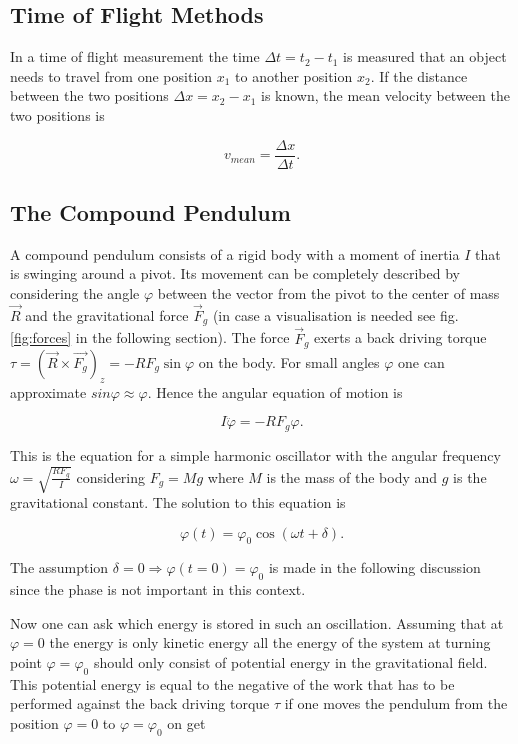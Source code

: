 \subsection{Time of Flight Methods}

In a time of flight measurement the time $\Delta t=t_2-t_1$ is measured that an object needs to travel from one position $x_1$ to another position $x_2$. If the distance between the two positions $\Delta x=x_2-x_1$ is known, the mean velocity between the two positions is

\begin{equation}
v_{mean}=\frac{\Delta x}{\Delta t}.
\end{equation}

\subsection{The Compound Pendulum}

A compound pendulum consists of a rigid body with a moment of inertia $I$ that is swinging around a pivot. Its movement can be completely described by considering the angle $\varphi$ between the vector from the pivot to the center of mass $\vec{R}$ and the gravitational force $\vec{F}_g$ (in case a visualisation is needed see fig. \ref{fig:forces} in the following section). The force $\vec{F}_g$ exerts a back driving torque $\tau = (\vec{R} \times \vec{F_g})_z = -R F_g \sin \varphi$ on the body. For small angles $\varphi$ one can approximate $sin\varphi \approx \varphi$. Hence the angular equation of motion is

\begin{equation}
I\ddot{\varphi} = -R F_g \varphi.
\end{equation}
 
This is the equation for a simple harmonic oscillator with the angular frequency $\omega = \sqrt{\frac{R F_g}{I}}$ considering $F_g=Mg$ where $M$ is the mass of the body and $g$ is the gravitational constant. The solution to this equation is

\begin{equation}\label{eq:sho}
\varphi(t) = \varphi _0 \cos\left(\omega t + \delta\right).
\end{equation}

The assumption $\delta=0 \Rightarrow \varphi(t=0)=\varphi_0$ is made in the following discussion since the phase is not important in this context.

Now one can ask which energy is stored in such an oscillation. Assuming that at $\varphi=0$ the energy is only kinetic energy all the energy of the system at turning point $\varphi=\varphi_0$  should only consist of potential energy in the gravitational field. This potential energy is equal to the negative of the work that has to be performed \cite{torque} against the back driving torque $\tau$ if one moves the pendulum from the position  $\varphi=0$ to $\varphi=\varphi_0$ on get

